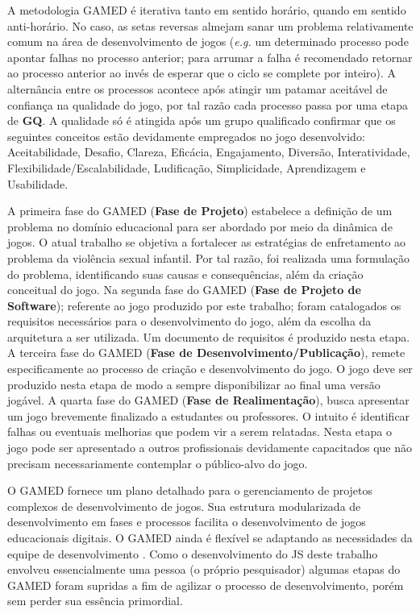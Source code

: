 A metodologia \ac{GAMED} é iterativa tanto em sentido horário, quando em sentido anti-horário. No caso, as setas reversas almejam sanar um problema relativamente comum na área de desenvolvimento de jogos (\textit{e.g.} um determinado processo pode apontar falhas no processo anterior; para arrumar a falha é recomendado retornar ao processo anterior ao invés de esperar que o ciclo se complete por inteiro). A alternância entre os processos acontece após atingir um patamar aceitável de confiança na qualidade do jogo, por tal razão cada processo passa por uma etapa de \textbf{\ac{GQ}}. A qualidade só é atingida após um grupo qualificado confirmar que os seguintes conceitos estão devidamente empregados no jogo desenvolvido: Aceitabilidade, Desafio, Clareza, Eficácia, Engajamento, Diversão, Interatividade, Flexibilidade/Escalabilidade, Ludificação, Simplicidade, Aprendizagem e Usabilidade. 

A primeira fase do \ac{GAMED} (\textbf{Fase de Projeto}) estabelece a definição de um problema no domínio educacional para ser abordado por meio da dinâmica de jogos. O atual trabalho se objetiva a fortalecer as estratégias de enfretamento ao problema da violência sexual infantil. Por tal razão, foi realizada uma formulação do problema, identificando suas causas e consequências, além da criação conceitual do jogo. Na segunda fase do \ac{GAMED} (\textbf{Fase de Projeto de Software}); referente ao jogo produzido por este trabalho; foram catalogados os requisitos necessários para o desenvolvimento do jogo, além da escolha da arquitetura a ser utilizada. Um documento de requisitos é produzido nesta etapa. A terceira fase do \ac{GAMED} (\textbf{Fase de Desenvolvimento/Publicação}), remete especificamente ao processo de criação e desenvolvimento do jogo. O jogo deve ser produzido nesta etapa de modo a sempre disponibilizar ao final uma versão jogável. A quarta fase do \ac{GAMED} (\textbf{Fase de Realimentação}), busca apresentar um jogo brevemente finalizado a estudantes ou professores. O intuito é identificar falhas ou eventuais melhorias que podem vir a serem relatadas. Nesta etapa o jogo pode ser apresentado a outros profissionais devidamente capacitados que não precisam necessariamente contemplar o público-alvo do jogo.

O \ac{GAMED} fornece um plano detalhado para o gerenciamento de projetos complexos de desenvolvimento de jogos. Sua estrutura modularizada de desenvolvimento em fases e processos facilita o desenvolvimento de jogos educacionais digitais. O \ac{GAMED} ainda é flexível se adaptando as necessidades da equipe de desenvolvimento \cite{aslan2016digital}. Como o desenvolvimento do \ac{JS} deste trabalho envolveu essencialmente uma pessoa (o próprio pesquisador) algumas etapas do \ac{GAMED} foram supridas a fim de agilizar o processo de desenvolvimento, porém sem perder sua essência primordial. 

